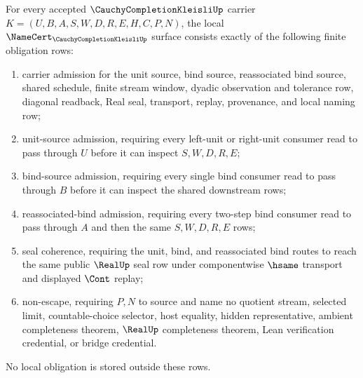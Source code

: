 \begin{theorem}
\label{thm:cauchy-completion-kleisli-namecert-obligations}
For every accepted $\CauchyCompletionKleisliUp$ carrier $K=(U,B,A,S,W,D,R,E,H,C,P,N)$, the local $\NameCert_{\CauchyCompletionKleisliUp}$ surface consists exactly of the following finite obligation rows:
\begin{enumerate}
\item carrier admission for the unit source, bind source, reassociated bind source, shared schedule, finite stream window, dyadic observation and tolerance row, diagonal readback, Real seal, transport, replay, provenance, and local naming row;
\item unit-source admission, requiring every left-unit or right-unit consumer read to pass through $U$ before it can inspect $S,W,D,R,E$;
\item bind-source admission, requiring every single bind consumer read to pass through $B$ before it can inspect the shared downstream rows;
\item reassociated-bind admission, requiring every two-step bind consumer read to pass through $A$ and then the same $S,W,D,R,E$ rows;
\item seal coherence, requiring the unit, bind, and reassociated bind routes to reach the same public $\RealUp$ seal row under componentwise $\hsame$ transport and displayed $\Cont$ replay;
\item non-escape, requiring $P,N$ to source and name no quotient stream, selected limit, countable-choice selector, host equality, hidden representative, ambient completeness theorem, $\RealUp$ completeness theorem, Lean verification credential, or bridge credential.
\end{enumerate}
No local obligation is stored outside these rows.
\end{theorem}
